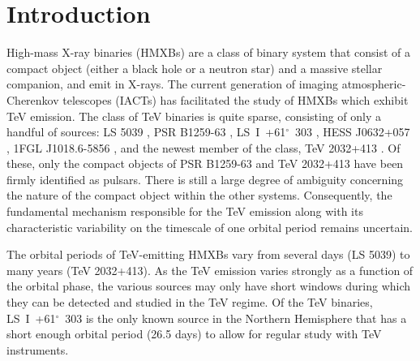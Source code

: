 \documentclass[preprint2]{aastex}
\newcommand{\lsi}{LS~I~+61$^{\circ}$~303}
\begin{document}
\keywords{}

\section{Introduction}

High-mass X-ray binaries (HMXBs) are a class of binary system that consist of a compact object (either a black hole or a neutron star) and a massive stellar companion, and emit in X-rays. The current generation of imaging atmospheric-Cherenkov telescopes (IACTs) has facilitated the study of HMXBs which exhibit TeV emission. The class of TeV binaries is quite sparse, consisting of only a handful of sources: LS 5039 \citep{2005Sci...309..746A}, PSR B1259-63 \citep{2005A&A...442....1A}, \lsi{} \citep{Albert2006}, HESS J0632+057 \citep{2007A&A...469L...1A}, 1FGL J1018.6-5856 \citep{2015arXiv150302711H}, and the newest member of the class, TeV 2032+413 \citep{2015MNRAS.451..581L}. Of these, only the compact objects of PSR B1259-63 and TeV 2032+413 have been firmly identified as pulsars. There is still a large degree of ambiguity concerning the nature of the compact object within the other systems. Consequently, the fundamental mechanism responsible for the TeV emission along with its characteristic variability on the timescale of one orbital period remains uncertain.



The orbital periods of TeV-emitting HMXBs vary from several days (LS 5039) to many years (TeV 2032+413). As the TeV emission varies strongly as a function of the orbital phase, the various sources may only have short windows during which they can be detected and studied in the TeV regime. Of the TeV binaries, \lsi{} is the only known source in the Northern Hemisphere that has a short enough orbital period (26.5 days) to allow for regular study with TeV instruments. 
\end{document}
